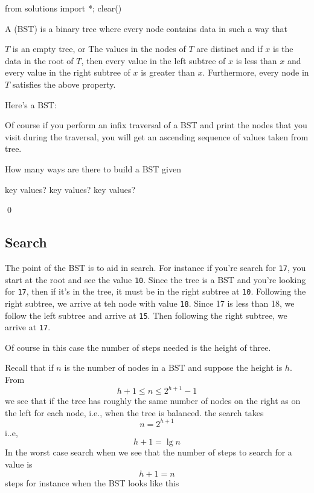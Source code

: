 \begin{python0}
from solutions import *; clear()
\end{python0}

A  (BST)
is a binary tree where every node contains data in such a way that
\begin{itemize}
\li $T$ is an empty tree, or
\li The values in the nodes of $T$ are distinct
    and if $x$ is the data in the root of $T$, then every
    value in the left subtree of $x$ is less than $x$
    and every value in the right subtree of $x$ is greater than $x$.
    Furthermore, every node in $T$ satisfies the above
    property.
\end{itemize}

Here's a BST:


Of course if you perform an infix traversal of a BST and print the
nodes that you visit during the traversal, you will get an ascending
sequence of values taken from tree.


\begin{ex}
How many ways are there to build a BST given
\begin{tightlist}
   key values?
   key values?
   key values?
\end{tightlist}
\qed
\end{ex}
  
\newpage
\subsection{Search}

The point of the BST is to aid in search.
For instance if you're search for \verb!17!, 
you start at the root and see the value \verb!10!.
Since the tree is a BST and you're looking for \verb!17!,
then if it's in the tree, it must be in the right subtree at \verb!10!.
Following the right subtree, we arrive at teh node with value \verb!18!.
Since 17 is less than 18, we follow the left subtree and arrive at 
\verb!15!.
Then following the right subtree, we arrive at \verb!17!.

Of course in this case the number of steps needed is the height of three.

Recall that if $n$ is the number of nodes in a BST
and suppose the height is $h$.
From
\[
h + 1 \leq n \leq 2^{h+1} - 1
\]
we see that 
if the tree has roughly the same number of nodes on the right 
as on the left for each node, i.e., when the tree is balanced. 
the search 
takes
\[
n = 2^{h + 1}
\]
i..e, 
\[
h + 1 = \lg n
\]
In the worst case search when
we see that the number of steps to search for a value is
\[
h + 1 = n 
\]
steps for instance when the BST looks like this

